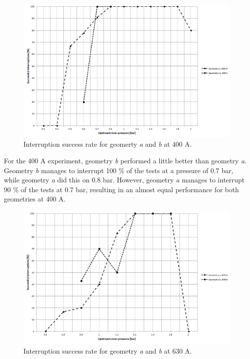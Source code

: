\documentclass[10pt,a4paper,twoside]{article}
\begin{document}
\begin{figure}[H]
\centering
\includegraphics[scale=0.5]{Bilder/Results/successRate400A.png}
\caption{Interruption success rate for geomerty \textit{a} and \textit{b} at 400 A.} \label{fig:successRate400A}
\end{figure}

For the 400 A experiment, geometry \textit{b} performed a little better than geometry \textit{a}. Geometry \textit{b} manages to interrupt 100 \% of the tests at a pressure of 0.7 bar, while geometry \textit{a} did this on 0.8 bar. However, geometry \textit{a} manages to interrupt 90 \% of the tests at 0.7 bar, resulting in an almost equal performance for both geometries at 400 A.

\begin{figure}[H]
\centering
\includegraphics[scale=0.5]{Bilder/Results/successRate630A.png}
\caption{Interruption success rate for geometry \textit{a} and \textit{b} at 630 A.} \label{fig:successRate630A}
\end{figure}
\end{document}
